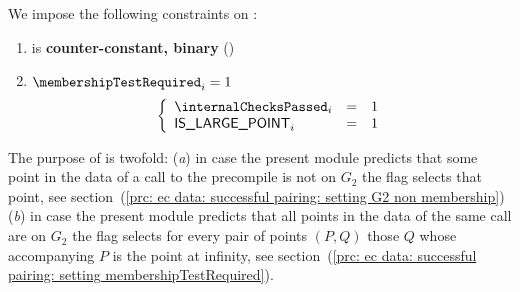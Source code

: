We impose the following constraints on \membershipTestRequired{}:
\begin{enumerate}
    \item \membershipTestRequired{} is \textbf{counter-constant, binary} \quad (\trash)
    \item \If $\membershipTestRequired_{i} = 1$ \Then
        \[
            \left\{ \begin{array}{lcl}
                \internalChecksPassed _{i} & = & 1 \\
                \isLargePoint_{i}          & = & 1 \\
            \end{array} \right.
        \]
\end{enumerate}
\saNote{} The purpose of \membershipTestRequired{} is twofold:
(\emph{a}) in case the present module predicts that some point in the data of a call to the  precompile is not on $G_2$ the \membershipTestRequired{} flag selects that point, see section~(\ref{prc: ec data: successful pairing: setting G2 non membership})
(\emph{b}) in case the present module predicts that all points in the data of the same call are on $G_2$ the \membershipTestRequired{} flag selects for every pair of points $(P,Q)$ those $Q$ whose accompanying $P$ is the point at infinity, see section~(\ref{prc: ec data: successful pairing: setting membershipTestRequired}).
